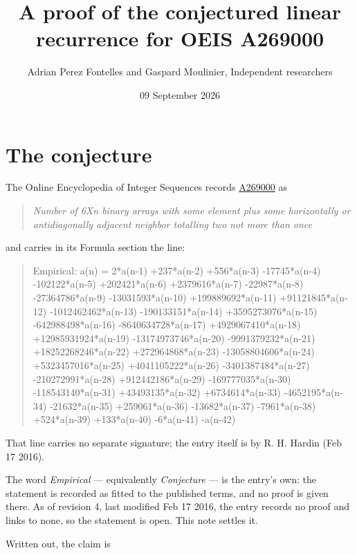 \documentclass[11pt]{article}
\title{A proof of the conjectured linear recurrence for OEIS A269000}
\author{Adrian Perez Fontelles and Gaspard Moulinier, Independent researchers}
\date{09 September 2026}
\theoremstyle{definition}
\begin{document}
\maketitle
\section{The conjecture}

The Online Encyclopedia of Integer Sequences records \href{https://oeis.org/A269000}{A269000} as

\begin{quote}\itshape Number of 6Xn binary arrays with some element plus some horizontally or antidiagonally adjacent neighbor totalling two not more than once\end{quote}

and carries in its Formula section the line:

\begin{quote}\ttfamily Empirical: a(n) = 2*a(n-1) +237*a(n-2) +556*a(n-3) -17745*a(n-4) -102122*a(n-5) +202421*a(n-6) +2379616*a(n-7) -22987*a(n-8) -27364786*a(n-9) -13031593*a(n-10) +199889692*a(n-11) +91121845*a(n-12) -1012462462*a(n-13) -190133151*a(n-14) +3595273076*a(n-15) -642988498*a(n-16) -8640634728*a(n-17) +4929067410*a(n-18) +12985931924*a(n-19) -13174973746*a(n-20) -9991379232*a(n-21) +18252268246*a(n-22) +272964868*a(n-23) -13058804606*a(n-24) +5323457016*a(n-25) +4041105222*a(n-26) -3401387484*a(n-27) -210272991*a(n-28) +912442186*a(n-29) -169777035*a(n-30) -118543140*a(n-31) +43493135*a(n-32) +6734614*a(n-33) -4652195*a(n-34) -21632*a(n-35) +259061*a(n-36) -13682*a(n-37) -7961*a(n-38) +524*a(n-39) +133*a(n-40) -6*a(n-41) -a(n-42)\end{quote}

That line carries no separate signature; the entry itself is by R. H. Hardin (Feb 17 2016).

The word {\itshape Empirical} --- equivalently {\itshape Conjecture} --- is the entry's own: the statement is recorded as fitted to the published terms, and no proof is given there. As of revision 4, last modified Feb 17 2016, the entry records no proof and links to none, so the statement is open. This note settles it.

Written out, the claim is
\end{document}
